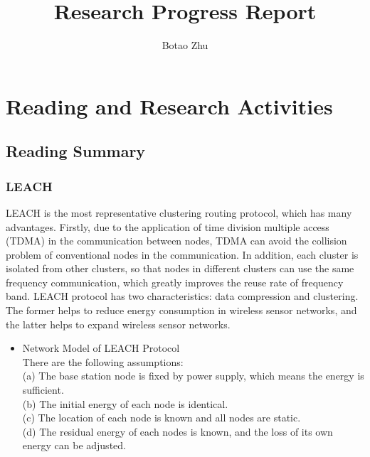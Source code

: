 \documentclass[11pt]{report}
\title{Research Progress Report}
\author{Botao Zhu}
\begin{document}
	
	\maketitle
	 \chead{} 
	 \cfoot{} 
	\renewcommand{\footrulewidth}{1.0pt}
	\renewcommand{\headrulewidth}{2.0pt}
	\renewcommand{\arraystretch}{1.3}
	\pagestyle{fancy}
	
	\renewcommand{\thesection}{\arabic{section}}
	
	\section{Reading and Research Activities}
	
	\subsection{Reading Summary}
	
	
	
	
	\subsubsection{LEACH}
	
	\noindent LEACH \cite{926982} is the most representative clustering routing protocol, which has many advantages. Firstly, due to the application of time division multiple access (TDMA) in the communication between nodes, TDMA can avoid the collision problem of conventional nodes in the communication. In addition, each cluster is isolated from other clusters, so that nodes in different clusters can use the same frequency communication, which greatly improves the reuse rate of frequency band. LEACH protocol has two characteristics: data compression and clustering. The former helps to reduce energy consumption in wireless sensor networks, and the latter helps to expand wireless sensor networks. 
	
	\begin{itemize}
		\item Network Model of LEACH Protocol\\
		
		There are the following assumptions:\\
		(a) The base station node is fixed by power supply, which means the energy is sufficient.\\
		(b) The initial energy of each node is identical.\\
		(c) The location of each node is known and all nodes are static.\\
		(d) The residual energy of each nodes is known, and the loss of its own energy can be adjusted.\\
		
	\end{itemize}
	
\end{document}
